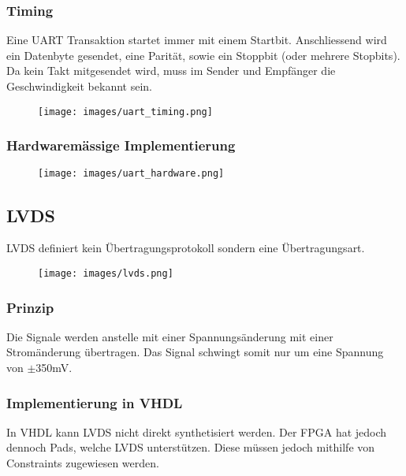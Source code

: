 \subsubsection{Timing}
Eine UART Transaktion startet immer mit einem Startbit. Anschliessend wird ein Datenbyte gesendet, eine Parität, sowie ein Stoppbit (oder mehrere Stopbits). Da kein Takt mitgesendet wird, muss im Sender und Empfänger die Geschwindigkeit bekannt sein.
\begin{figure}[H]
    \texttt{[image: images/uart\_timing.png]}
\end{figure}

\subsubsection{Hardwaremässige Implementierung}
\begin{figure}[H]
    \texttt{[image: images/uart\_hardware.png]}
\end{figure}

\subsection{LVDS}
LVDS definiert kein Übertragungsprotokoll sondern eine Übertragungsart.
\begin{multicols}{2}
     \begin{figure}[H]
        \texttt{[image: images/lvds.png]}
    \end{figure}

    \subsubsection{Prinzip}
    Die Signale werden anstelle mit einer Spannungsänderung mit einer Stromänderung übertragen. Das Signal schwingt somit nur um eine Spannung von $\pm$350mV.

    \subsubsection{Implementierung in VHDL}
    In VHDL kann LVDS nicht direkt synthetisiert werden. Der FPGA hat jedoch dennoch Pads, welche LVDS unterstützen. Diese müssen jedoch mithilfe von Constraints zugewiesen werden.
    
\end{multicols}
